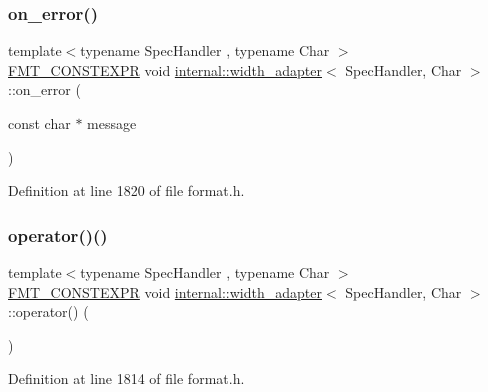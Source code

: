 \subsubsection{\texorpdfstring{on\+\_\+error()}{on\_error()}}
{\footnotesize\ttfamily template$<$typename Spec\+Handler , typename Char $>$ \\
\hyperlink{core_8h_a69201cb276383873487bf68b4ef8b4cd}{F\+M\+T\+\_\+\+C\+O\+N\+S\+T\+E\+X\+PR} void \hyperlink{structinternal_1_1width__adapter}{internal\+::width\+\_\+adapter}$<$ Spec\+Handler, Char $>$\+::on\+\_\+error (\begin{DoxyParamCaption}\item[{const char $\ast$}]{message }\end{DoxyParamCaption})\hspace{0.3cm}{\ttfamily [inline]}}



Definition at line 1820 of file format.\+h.

\mbox{\label{structinternal_1_1width__adapter_ac2a2429eeed8b2839a59b9f4976a75e7}} 
\subsubsection{\texorpdfstring{operator()()}{operator()()}\hspace{0.1cm}{\footnotesize\ttfamily [1/3]}}
{\footnotesize\ttfamily template$<$typename Spec\+Handler , typename Char $>$ \\
\hyperlink{core_8h_a69201cb276383873487bf68b4ef8b4cd}{F\+M\+T\+\_\+\+C\+O\+N\+S\+T\+E\+X\+PR} void \hyperlink{structinternal_1_1width__adapter}{internal\+::width\+\_\+adapter}$<$ Spec\+Handler, Char $>$\+::operator() (\begin{DoxyParamCaption}{ }\end{DoxyParamCaption})\hspace{0.3cm}{\ttfamily [inline]}}



Definition at line 1814 of file format.\+h.

\mbox{\label{structinternal_1_1width__adapter_acb535674b492750d589bd4f08abe48b2}} 

